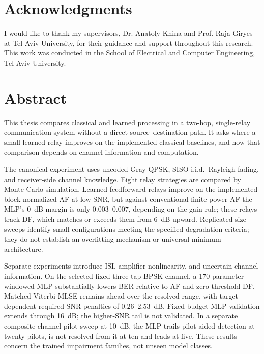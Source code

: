 \cleardoublepage
{}
\chapter*{Acknowledgments}

I would like to thank my supervisors, Dr. Anatoly Khina and Prof. Raja Giryes at Tel Aviv University, for their guidance and support throughout this research.
This work was conducted in the School of Electrical and Computer Engineering, Tel Aviv University.

\clearpage

\chapter*{Abstract}

\label{sec:abstract-english}

This thesis compares classical and learned processing in a two-hop, single-relay communication system without a direct source--destination path. It asks where a small learned relay improves on the implemented classical baselines, and how that comparison depends on channel information and computation.

The canonical experiment uses uncoded Gray-QPSK, SISO i.i.d.\ Rayleigh fading, and receiver-side channel knowledge. Eight relay strategies are compared by Monte Carlo simulation. Learned feedforward relays improve on the implemented block-normalized AF at low SNR, but against conventional finite-power AF the MLP's 0~dB margin is only $0.003$--$0.007$, depending on the gain rule; these relays track DF, which matches or exceeds them from 6~dB upward. Replicated size sweeps identify small configurations meeting the specified degradation criteria; they do not establish an overfitting mechanism or universal minimum architecture.

Separate experiments introduce ISI, amplifier nonlinearity, and uncertain channel information. On the selected fixed three-tap BPSK channel, a 170-parameter windowed MLP substantially lowers BER relative to AF and zero-threshold DF. Matched Viterbi MLSE remains ahead over the resolved range, with target-dependent required-SNR penalties of $0.26$--$2.53$~dB. Fixed-budget MLP validation extends through 16~dB; the higher-SNR tail is not validated. In a separate composite-channel pilot sweep at 10~dB, the MLP trails pilot-aided detection at twenty pilots, is not resolved from it at ten and leads at five. These results concern the trained impairment families, not unseen model classes.

